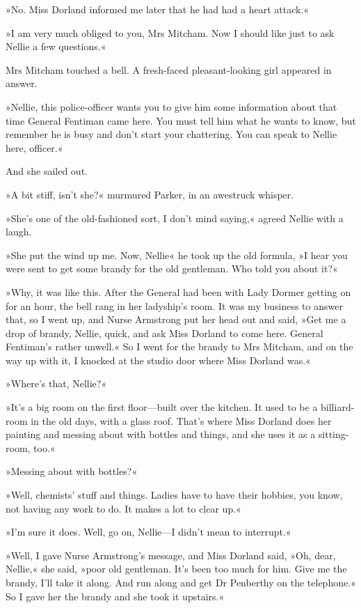 »No. Miss Dorland informed me later that he had had a heart attack.«

»I am very much obliged to you, Mrs Mitcham. Now I should like just to ask Nellie a few questions.«

Mrs Mitcham touched a bell. A fresh-faced pleasant-looking girl appeared in answer.

»Nellie, this police-officer wants you to give him some information about that time General Fentiman came here. You must tell him what he wants to know, but remember he is busy and don't start your chattering. You can speak to Nellie here, officer.«

And she sailed out.

»A bit stiff, isn't she?« murmured Parker, in an awestruck whisper.

»She's one of the old-fashioned sort, I don't mind saying,« agreed Nellie with a laugh.

»She put the wind up me. Now, Nellie\longdash« he took up the old formula, »I hear you were sent to get some brandy for the old gentleman. Who told you about it?«

»Why, it was like this. After the General had been with Lady Dormer getting on for an hour, the bell rang in her ladyship's room. It was my business to answer that, so I went up, and Nurse Armstrong put her head out and said, »Get me a drop of brandy, Nellie, quick, and ask Miss Dorland to come here. General Fentiman's rather unwell.« So I went for the brandy to Mrs Mitcham, and on the way up with it, I knocked at the studio door where Miss Dorland was.«

»Where's that, Nellie?«

»It's a big room on the first floor—built over the kitchen. It used to be a billiard-room in the old days, with a glass roof. That's where Miss Dorland does her painting and messing about with bottles and things, and she uses it as a sitting-room, too.«

»Messing about with bottles?«

»Well, chemists' stuff and things. Ladies have to have their hobbies, you know, not having any work to do. It makes a lot to clear up.«

»I'm sure it does. Well, go on, Nellie—I didn't mean to interrupt.«

»Well, I gave Nurse Armstrong's message, and Miss Dorland said, »Oh, dear, Nellie,« she said, »poor old gentleman. It's been too much for him. Give me the brandy, I'll take it along. And run along and get Dr Penberthy on the telephone.« So I gave her the brandy and she took it upstairs.«

